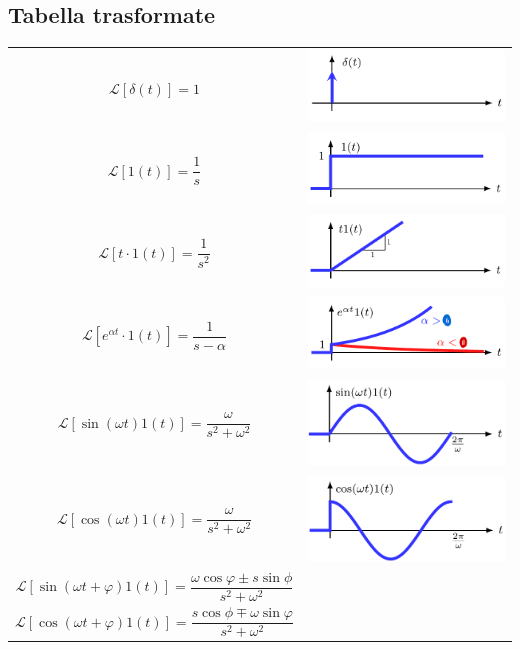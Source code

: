 \documentclass{article}
\numberwithin{equation}{subsection}
\let\oldsubsection\subsection%
\renewcommand{\subsection}{%
  \renewcommand{\theequation}{\thesubsection.\arabic{equation}}%
  \oldsubsection}%
\begin{document}
\subsection{Tabella trasformate}\label{Tabella trasformate}

\begin{center}
    \renewcommand{\arraystretch}{5}
    \begin{tabular}{c c}
        $\mathcal{L}[\delta(t)]=1$ & 
        \includegraphics[width=0.25\linewidth, valign=c]{Images/Delta.png}
        \\
        $\mathcal{L}[1(t)]=\dfrac{1}{s}$ & 
        \includegraphics[width=0.25\linewidth, valign=c]{Images/Scalino.png}
        \\
        $\mathcal{L}[t \cdot 1(t)]=\dfrac{1}{s^2}$ & 
        \includegraphics[width=0.25\linewidth, valign=c]{Images/Scalino_2.png}
        \\
        $\mathcal{L}[e^{\alpha t} \cdot 1(t)]=\dfrac{1}{s-\alpha}$ & 
        \includegraphics[width=0.25\linewidth, valign=c]{Images/Scalino_3.png}\\
        $\mathcal{L}[\sin(\omega t)1(t)]= \dfrac{\omega}{s^2+\omega^2}$ & \includegraphics[width=0.25\linewidth, valign=c]{Images/Trasformata_seno.png}\\
        $\mathcal{L}[\cos(\omega t)1(t)]= \dfrac{\omega}{s^2+\omega^2}$ & \includegraphics[width=0.25\linewidth, valign=c]{Images/Trasformata_coseno.png}\\
        $\mathcal{L}[\sin(\omega t + \varphi)1(t)]= \dfrac{\omega \cos\varphi \pm s \sin\phi}{s^2+\omega^2}$\\
        $\mathcal{L}[\cos(\omega t + \varphi)1(t)]= \dfrac{s \cos\phi \mp \omega \sin\varphi}{s^2+\omega^2}$
    \end{tabular}
\end{center}
\end{document}
